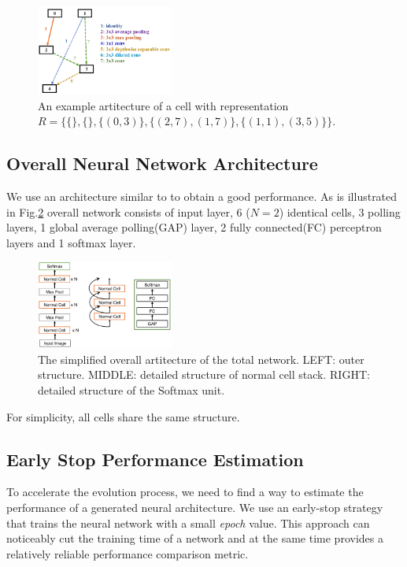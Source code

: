 \documentclass[conference]{IEEEtran}
\begin{document}
  \begin{figure}[H]
     \centering
     \includegraphics[width=0.4\textwidth]{figures/cellStruct.png}
   \caption{An example artitecture of a cell with representation $R=\{\{\},\{\},\{(0,3)\},\{(2,7),(1,7)\},\{(1,1),(3,5)\}\}$.}\label{fig:digit}
   \label{f_artc}
  \end{figure}

  \subsection{Overall Neural Network Architecture}
  We use an architecture similar to \cite{He_2016_CVPR} to obtain a good performance. As is illustrated in Fig.\ref{total_artc} overall network consists of input layer, 6 ($N = 2$) identical cells, 3 polling layers, 1 global average polling(GAP) layer, 2 fully connected(FC) perceptron layers and 1 softmax layer. 

  \begin{figure}[H]
     \centering
     \includegraphics[width=0.4\textwidth]{figures/overallStruct.png}
   \caption{The simplified overall artitecture of the total network. LEFT: outer structure. MIDDLE: detailed structure of normal cell stack. RIGHT: detailed structure of the Softmax unit.}\label{fig:digit}
   \label{total_artc}
  \end{figure}

  For simplicity, all cells share the same structure.
  
  

  \subsection{Early Stop Performance Estimation}

  To accelerate the evolution process, we need to find a way to estimate the performance of a generated neural architecture. We use an early-stop strategy that trains the neural network with a small \emph{epoch} value. This approach can noticeably cut the training time of a network and at the same time provides a relatively reliable performance comparison metric.
\end{document}
